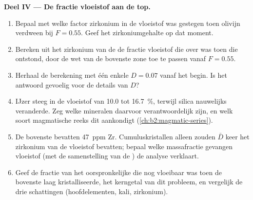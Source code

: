 \begin{problem}
\noindent\textbf{Deel IV --- De fractie vloeistof aan de top.}
\begin{enumerate}[resume]
\item Bepaal met welke factor zirkonium in de vloeistof was gestegen toen olivijn verdween bij
$F = 0.55$. Geef het zirkoniumgehalte op dat moment.
\item Bereken uit het zirkonium van de  de fractie vloeistof die over was toen
die ontstond, door de wet van de bovenste zone toe te passen vanaf $F = 0.55$.
\item Herhaal de berekening met één enkele $D = 0.07$ vanaf het begin. Is het antwoord
gevoelig voor de details van $D$?
\item IJzer steeg in de vloeistof van 10.0 tot \qty{16.7}{\percent}, terwijl silica nauwelijks
veranderde. Zeg welke mineralen daarvoor verantwoordelijk zijn, en welk soort magmatische reeks
dit aankondigt (\cref{ch:b2:magmatic-series}).
\item De bovenste  bevatten \qty{47}{ppm} Zr. Cumuluskristallen alleen zouden
$\bar D$ keer het zirkonium van de vloeistof bevatten; bepaal welke massafractie gevangen vloeistof
(met de samenstelling van de ) de analyse verklaart.
\item Geef de fractie van het oorspronkelijke  die nog vloeibaar was toen de bovenste laag
kristalliseerde, het kerngetal van dit probleem, en vergelijk de drie schattingen
(hoofdelementen, kali, zirkonium).
\end{enumerate}
\end{problem}
